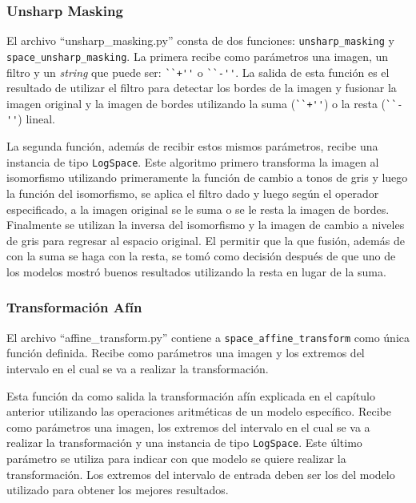\subsubsection{Unsharp Masking}

El archivo ``unsharp\_masking.py'' consta de dos funciones: \verb|unsharp_masking| y \verb|space_unsharp_masking|. La primera recibe como par\'ametros una imagen, un filtro y un \textit{string} que puede ser: \verb|``+''| o \verb|``-''|. La salida de esta funci\'on es el resultado de utilizar el filtro para detectar los bordes de la imagen y fusionar la imagen original y la imagen de bordes utilizando la suma (\verb|``+''|) o la resta (\verb|``-''|) lineal. 

La segunda funci\'on, adem\'as de recibir estos mismos par\'ametros, recibe una instancia de tipo \verb|LogSpace|. Este algoritmo primero transforma la imagen al isomorfismo utilizando primeramente la funci\'on de cambio a tonos de gris y luego la funci\'on del isomorfismo, se aplica el filtro dado y luego seg\'un el operador especificado, a la imagen original se le suma o se le resta la imagen de bordes. Finalmente se utilizan la inversa del isomorfismo y la imagen de cambio a niveles de gris para regresar al espacio original. El permitir que la que fusi\'on, adem\'as de con la suma se haga con la resta, se tom\'o como decisi\'on despu\'es de que uno de los modelos mostr\'o buenos resultados utilizando la resta en lugar de la suma. 

\subsubsection{Transformaci\'on Af\'in}

El archivo ``affine\_transform.py'' contiene a \verb|space_affine_transform| como \'unica funci\'on definida. Recibe como par\'ametros una imagen y los extremos del intervalo en el cual se va a realizar la transformaci\'on. 

Esta funci\'on da como salida la transformaci\'on af\'in explicada en el cap\'itulo anterior utilizando las operaciones aritm\'eticas de un modelo espec\'ifico. Recibe como par\'ametros una imagen, los extremos del intervalo en el cual se va a realizar la transformaci\'on y una instancia de tipo \verb|LogSpace|. Este \'ultimo par\'ametro se utiliza para indicar con que modelo se quiere realizar la transformaci\'on. Los extremos del intervalo de entrada deben ser los del modelo utilizado para obtener los mejores resultados.

